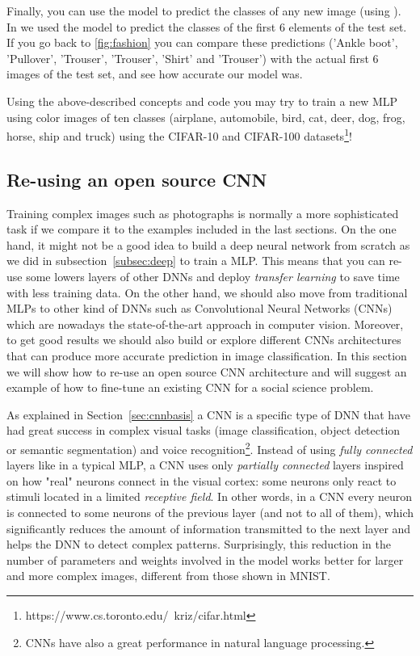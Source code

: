 
Finally, you can use the model to predict the classes of any new image (using ). In  we used the model to predict the classes of the first 6 elements of the test set. If you go back to \ref{fig:fashion} you can compare these predictions ('Ankle boot', 'Pullover', 'Trouser', 'Trouser', 'Shirt' and 'Trouser') with the actual first 6 images of the test set, and see how accurate our model was.


Using the above-described concepts and code you may try to train a new MLP using color images of ten classes (airplane, automobile, bird, cat, deer, dog, frog, horse, ship and truck) using the CIFAR-10 and CIFAR-100 datasets\footnote{https://www.cs.toronto.edu/~kriz/cifar.html}!


\subsection{Re-using an open source CNN}
\label{subsec:tuning}

Training complex images such as photographs is normally a more sophisticated task if we compare it to the examples included in the last sections. On the one hand, it might not be a good idea to build a deep neural network from scratch as we did in subsection~\ref{subsec:deep} to train a MLP. This means that you can re-use some lowers layers of other DNNs and deploy \textit{transfer learning} to save time with less training data. On the other hand, we should also move from traditional MLPs to other kind of DNNs such as Convolutional Neural Networks (CNNs) which are  nowadays the state-of-the-art approach in computer vision. Moreover, to get good results we should also build or explore different CNNs architectures that can produce more accurate prediction in image classification.  In this section we will show how to re-use an open source CNN architecture and will suggest an example of how to fine-tune an existing CNN for a social science problem.

As explained in Section~\ref{sec:cnnbasis} a CNN is a specific type of DNN that have had great success in complex visual tasks (image classification, object detection or semantic segmentation) and voice recognition\footnote{CNNs have also a great performance in natural language processing.}. Instead of using \textit{fully connected} layers like in a typical MLP, a CNN uses only \textit{partially connected} layers inspired on how "real" neurons connect in the visual cortex: some neurons only react to stimuli located in a limited \textit{receptive field}. In other words, in a CNN every neuron is connected to some neurons of the previous layer (and not to all of them), which significantly reduces the amount of information transmitted to the next layer and helps the DNN to detect complex patterns. Surprisingly, this reduction in the number of parameters and weights involved in the model works better for larger and more complex images, different from those shown in MNIST.

